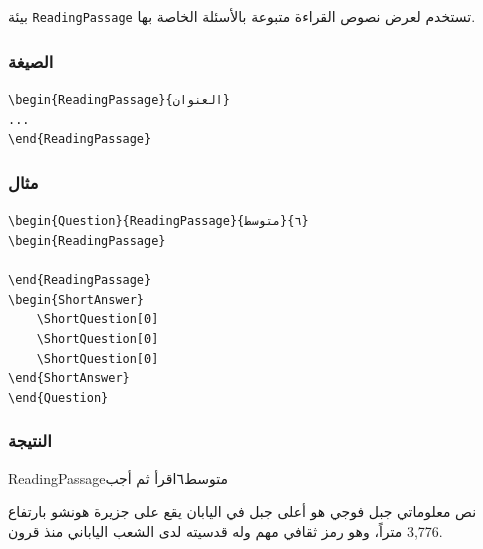 \documentclass[a4paper]{article}
\begin{document}
بيئة \texttt{ReadingPassage} تستخدم لعرض نصوص القراءة متبوعة بالأسئلة الخاصة بها.

\subsubsection*{الصيغة}

\begin{LTR}\ttfamily
\verb|\begin{ReadingPassage}{العنوان}|\\
\verb|...|\quad{}\\
\verb|\end{ReadingPassage}|
\end{LTR}

\subsubsection*{مثال}

\begin{LTR}\ttfamily
\verb|\begin{Question}{ReadingPassage}{متوسط}{٦}|\\
\verb|\begin{ReadingPassage}|\\
\\
\verb|\end{ReadingPassage}|\\
\verb|\begin{ShortAnswer}|\\
\verb|    \ShortQuestion[0]|\\    
\verb|    \ShortQuestion[0]|\\    
\verb|    \ShortQuestion[0]|\\    
\verb|\end{ShortAnswer}|\\
\verb|\end{Question}|
\end{LTR}

\subsubsection*{النتيجة}

\begin{Question}{ReadingPassage}{متوسط}{٦}{اقرأ ثم أجب}
\begin{ReadingPassage}{نص معلوماتي}
جبل فوجي هو أعلى جبل في اليابان يقع على جزيرة هونشو بارتفاع 3,776 متراً، وهو رمز ثقافي مهم وله قدسيته لدى الشعب الياباني منذ قرون.
\end{ReadingPassage}
\begin{ShortAnswer}
\end{ShortAnswer}
\end{Question}
\end{document}
